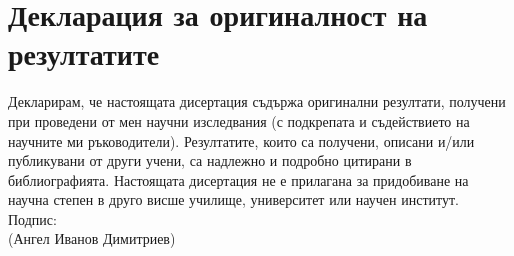 \clearpage
\thispagestyle{empty}

\section*{Декларация за оригиналност на резултатите}
Декларирам, че настоящата дисертация съдържа оригинални резултати, получени при проведени от мен научни изследвания (с подкрепата и съдействието на научните ми ръководители). Резултатите, които са получени, описани и/или публикувани от други учени, са надлежно и подробно цитирани в библиографията. Настоящата дисертация не е прилагана за придобиване на научна степен в друго висше училище, университет или научен институт.\\


\flushright Подпис: \phantom{(Ангел Иванов Димитриев)}\\
\flushright (Ангел Иванов Димитриев)


